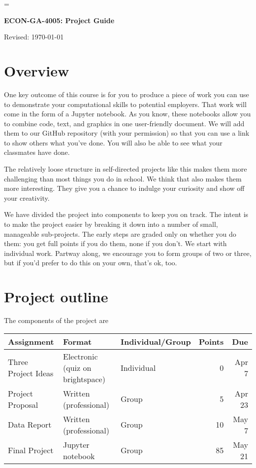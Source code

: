 \documentclass[11pt]{article}
\begin{document}
\parskip=\bigskipamount
\parindent=0.0in
\thispagestyle{empty}


\bigskip\bigskip
\centerline{\Large \bf ECON-GA-4005:  Project Guide}
\centerline{Revised: \today}

\section*{Overview}

One key outcome of this course is for you to produce a piece of work you can use
to demonstrate your computational skills to potential employers. That work will
come in the form of a Jupyter notebook. As you know, these notebooks allow you
to combine code, text, and graphics in one user-friendly document. We will add
them to our GitHub repository (with your permission) so that you can use a link
to show others what you've done. You will also be able to see what your
classmates have done.

The relatively loose structure in self-directed projects like this makes them
more challenging than most things you do in school. We think that also makes
them more interesting. They give you a chance to indulge your curiosity and show
off your creativity.

We have divided the project into components to keep you on track. The intent is
to make the project easier by breaking it down into a number of small,
manageable sub-projects. The early steps are graded only on whether you do them:
you get full points if you do them, none if you don't. We start with individual
work.  Partway along, we encourage you to form groups of two or three, but if
you'd prefer to do this on your own, that's ok, too.


\section*{Project outline}

The components of the project are
%
\begin{center}
  \begin{tabular}{lllrr}
    \toprule
    Assignment          & Format                           & Individual/Group & Points & Due    \\
    \midrule
    Three Project Ideas & Electronic (quiz on brightspace) & Individual       & 0      & Apr 7  \\
    Project Proposal    & Written (professional)           & Group            & 5      & Apr 23 \\
    Data Report         & Written (professional)           & Group            & 10     & May 7  \\
    Final Project       & Jupyter notebook                 & Group            & 85     & May 21 \\
    \bottomrule
  \end{tabular}
\end{center}
\end{document}

